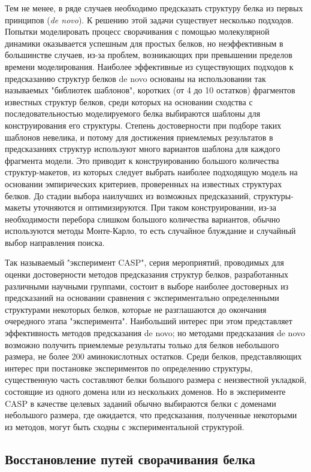 Тем не менее, в ряде случаев необходимо предсказать структуру белка из первых принципов (\textit{de novo}). К решению этой задачи существует несколько подходов. Попытки моделировать процесс сворачивания с помощью молекулярной динамики оказывается успешным для простых белков, но неэффективным в большинстве случаев, из-за проблем, возникающих при превышении пределов времени моделирования. Наиболее эффективные из существующих подходов к предсказанию структур белков de novo основаны на использовании так называемых "библиотек шаблонов", коротких (от 4 до 10 остатков) фрагментов известных структур белков, среди которых на основании сходства с последовательностью моделируемого белка выбираются шаблоны для конструирования его структуры. Степень достоверности при подборе таких шаблонов невелика, и потому для достижения приемлемых результатов в предсказаниях структур используют много вариантов шаблона для каждого фрагмента модели. Это приводит к конструированию большого количества структур-макетов, из которых следует выбрать наиболее подходящую модель на основании эмпирических критериев, проверенных на известных структурах белков. До стадии выбора наилучших из возможных предсказаний, структуры-макеты уточняются и оптимизируются. При таком конструировании, из-за необходимости перебора слишком большого количества вариантов, обычно используются методы Монте-Карло, то есть случайное блуждание и случайный выбор направления поиска. 

Так называемый "эксперимент CASP", серия мероприятий, проводимых для оценки достоверности методов предсказания структур белков, разработанных различными научными группами, состоит в выборе наиболее достоверных из предсказаний на основании сравнения с экспериментально определенными структурами некоторых белков, которые не разглашаются до окончания очередного этапа "эксперимента". Наибольший интерес при этом представляет эффективность методов предсказания de novo; но методами предсказания de novo возможно получить приемлемые результаты только для белков небольшого размера, не более 200 аминокислотных остатков. Среди белков, представляющих интерес при постановке экспериментов по определению структуры, существенную часть составляют белки большого размера с неизвестной укладкой, состоящие из одного домена или из нескольких доменов. Но в эксперименте CASP в качестве целевых заданий обычно выбираются белки с доменами небольшого размера, где ожидается, что предсказания, полученные некоторыми из методов, могут быть сходны с экспериментальной структурой.


\subsection{Восстановление путей сворачивания белка} \label{protein_folding}

